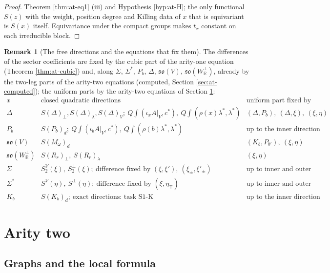 \documentclass[11pt]{article}
\numberwithin{equation}{section}
\theoremstyle{plain}
\theoremstyle{definition}
\newtheorem{remark}[theorem]{Remark}
\newcommand{\AV}{A|_V}
\begin{document}
\begin{proof}
Theorem \ref{thm:at-eq1} (iii) and Hypothesis \ref{hyp:at-H}; the only functional $S(z)$ with the weight, position degree and Killing data of $x$ that is equivariant is $S(x)$ itself. Equivariance under the compact groups makes $t_x$ constant on each irreducible block.
\end{proof}

\begin{remark}[The free directions and the equations that fix them]
\label{rem:at-freetable}
The differences of the sector coefficients are fixed by the cubic part of the arity-one equation (Theorem \ref{thm:at-cubic}) and, along $\Sigma$, $\Sigma^*$, $P_b$, $\Delta$, $\mathfrak{so}(V)$, $\mathfrak{so}(W^\perp_{\mathbb R})$, already by the two-leg parts of the arity-two equations (computed, Section \ref{sec:at-computed}); the uniform parts by the arity-two equations of Section \ref{sec:at-ar2}:
\[
\begin{array}{l|l|l}
x & \text{closed quadratic directions} & \text{uniform part fixed by}\\
\hline
\Delta & S(\Delta)_\perp,S(\Delta)_\lambda,S(\Delta)_V;\ Q\int(\iota_x\AV,c^*),\ Q\int(\rho(x)\lambda^*,\lambda^*) & (\Delta,P_b),\ (\Delta,\xi),\ (\xi,\eta)\\
P_b & S(P_b)_d;\ Q\int(\iota_b\AV,c^*),\ Q\int(\rho(b)\lambda^*,\lambda^*) & \text{up to the inner direction}\\
\mathfrak{so}(V) & S(M_\omega)_d & (K_b,P_{b'}),\ (\xi,\eta)\\
\mathfrak{so}(W^\perp_{\mathbb R}) & S(R_r)_\perp,\ S(R_r)_\lambda & (\xi,\eta)\\
\Sigma & S^V_2(\xi),\ S^\perp_2(\xi);\ \text{difference fixed by }(\xi,\xi'),\ (\xi_\pm,\xi'_\pm) & \text{up to inner and outer}\\
\Sigma^* & S^V(\eta),\ S^\perp(\eta);\ \text{difference fixed by }(\xi,\eta_\mp) & \text{up to inner and outer}\\
K_b & S(K_b)_d;\ \text{exact directions: task S1-K} & \text{up to the inner direction}
\end{array}
\]
\end{remark}

\section{Arity two}
\label{sec:at-ar2}

\subsection{Graphs and the local formula}
\end{document}
